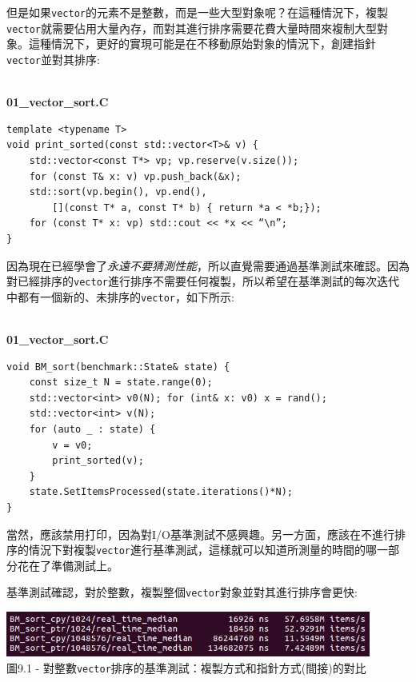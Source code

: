 但是如果\texttt{vector}的元素不是整數，而是一些大型對象呢？在這種情況下，複製\texttt{vector}就需要佔用大量內存，而對其進行排序需要花費大量時間來複制大型對象。這種情況下，更好的實現可能是在不移動原始對象的情況下，創建指針\texttt{vector}並對其排序:

\hspace*{\fill} \\ %
\noindent
\textbf{01\_vector\_sort.C}
\begin{lstlisting}[style=styleCXX]
template <typename T>
void print_sorted(const std::vector<T>& v) {
	std::vector<const T*> vp; vp.reserve(v.size());
	for (const T& x: v) vp.push_back(&x);
	std::sort(vp.begin(), vp.end(), 
		[](const T* a, const T* b) { return *a < *b;});
	for (const T* x: vp) std::cout << *x << “\n”;
}
\end{lstlisting}

因為現在已經學會了\textit{永遠不要猜測性能}，所以直覺需要通過基準測試來確認。因為對已經排序的\texttt{vector}進行排序不需要任何複製，所以希望在基準測試的每次迭代中都有一個新的、未排序的\texttt{vector}，如下所示:

\hspace*{\fill} \\ %
\noindent
\textbf{01\_vector\_sort.C}
\begin{lstlisting}[style=styleCXX]
void BM_sort(benchmark::State& state) {
	const size_t N = state.range(0);
	std::vector<int> v0(N); for (int& x: v0) x = rand();
	std::vector<int> v(N);
	for (auto _ : state) {
		v = v0;
		print_sorted(v);
	}
	state.SetItemsProcessed(state.iterations()*N);
}
\end{lstlisting}

當然，應該禁用打印，因為對I/O基準測試不感興趣。另一方面，應該在不進行排序的情況下對複製\texttt{vector}進行基準測試，這樣就可以知道所測量的時間的哪一部分花在了準備測試上。

基準測試確認，對於整數，複製整個\texttt{vector}對象並對其進行排序會更快:

\begin{center}
\includegraphics[width=0.9\textwidth]{content/3/chapter9/images/1.jpg}\\
圖9.1 - 對整數\texttt{vector}排序的基準測試：複製方式和指針方式(間接)的對比
\end{center}

